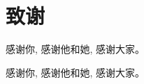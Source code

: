 
\cleardoublepage{}
{}
\titlespacing{\chapter}{0pt}{-1em}{1em}
\chapter*{致谢}

感谢你, 感谢他和她, 感谢大家。

感谢你, 感谢他和她, 感谢大家。